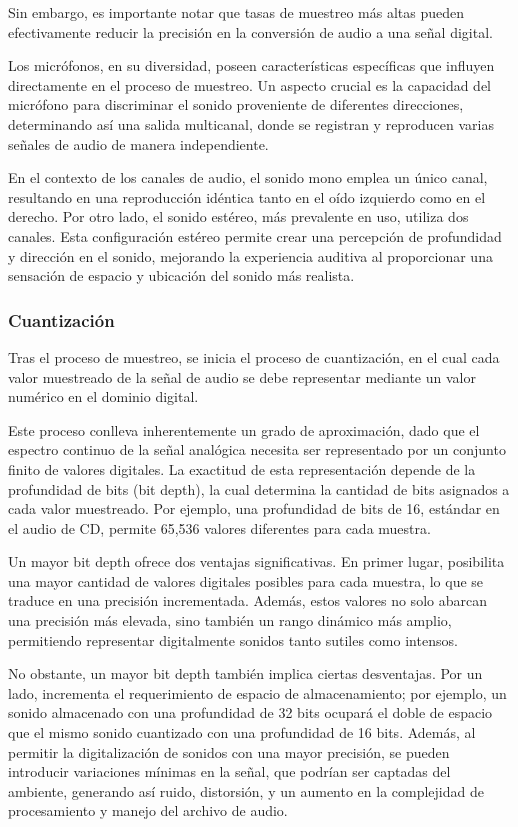 \documentclass{prgrado}
\begin{document}
Sin embargo, es importante notar que tasas de muestreo más altas pueden efectivamente reducir la precisión en la conversión de audio a una señal digital.

Los micrófonos, en su diversidad, poseen características específicas que influyen directamente en el proceso de muestreo. Un aspecto crucial es la capacidad del micrófono para discriminar el sonido proveniente de diferentes direcciones, determinando así una salida multicanal, donde se registran y reproducen varias señales de audio de manera independiente.

En el contexto de los canales de audio, el sonido mono emplea un único canal, resultando en una reproducción idéntica tanto en el oído izquierdo como en el derecho. Por otro lado, el sonido estéreo, más prevalente en uso, utiliza dos canales. Esta configuración estéreo permite crear una percepción de profundidad y dirección en el sonido, mejorando la experiencia auditiva al proporcionar una sensación de espacio y ubicación del sonido más realista.

\subsubsection{Cuantización}

Tras el proceso de muestreo, se inicia el proceso de cuantización, en el cual cada valor muestreado de la señal de audio se debe representar mediante un valor numérico en el dominio digital.

Este proceso conlleva inherentemente un grado de aproximación, dado que el espectro continuo de la señal analógica necesita ser representado por un conjunto finito de valores digitales. La exactitud de esta representación depende de la profundidad de bits (bit depth), la cual determina la cantidad de bits asignados a cada valor muestreado. Por ejemplo, una profundidad de bits de 16, estándar en el audio de CD, permite 65,536 valores diferentes para cada muestra. 

Un mayor bit depth ofrece dos ventajas significativas. En primer lugar, posibilita una mayor cantidad de valores digitales posibles para cada muestra, lo que se traduce en una precisión incrementada. Además, estos valores no solo abarcan una precisión más elevada, sino también un rango dinámico más amplio, permitiendo representar digitalmente sonidos tanto sutiles como intensos.

No obstante, un mayor bit depth también implica ciertas desventajas. Por un lado, incrementa el requerimiento de espacio de almacenamiento; por ejemplo, un sonido almacenado con una profundidad de 32 bits ocupará el doble de espacio que el mismo sonido cuantizado con una profundidad de 16 bits. Además, al permitir la digitalización de sonidos con una mayor precisión, se pueden introducir variaciones mínimas en la señal, que podrían ser captadas del ambiente, generando así ruido, distorsión, y un aumento en la complejidad de procesamiento y manejo del archivo de audio.
\end{document}

